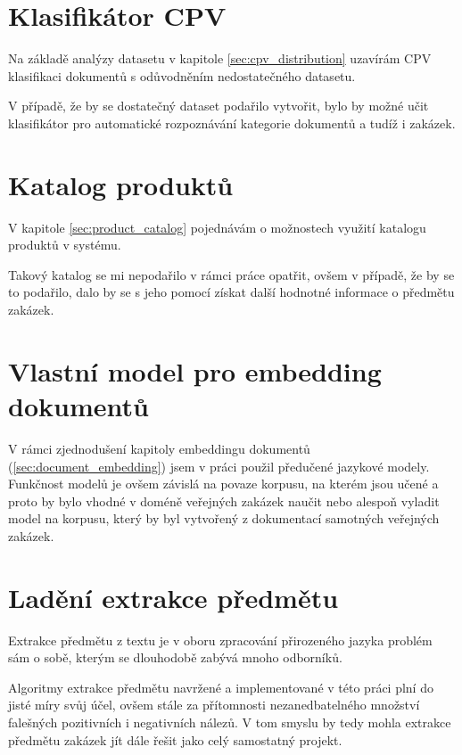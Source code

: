 \documentclass[thesis=M,czech]{FITthesis}[2019/12/23]
\begin{document}
\section{Klasifikátor CPV}

Na základě analýzy datasetu v kapitole \ref{sec:cpv_distribution} uzavírám CPV klasifikaci dokumentů s odůvodněním nedostatečného datasetu.

V případě, že by se dostatečný dataset podařilo vytvořit, bylo by možné učit klasifikátor pro automatické rozpoznávání kategorie dokumentů a tudíž i zakázek.

\section{Katalog produktů}

V kapitole \ref{sec:product_catalog} pojednávám o možnostech využití katalogu produktů v systému.

Takový katalog se mi nepodařilo v rámci práce opatřit, ovšem v případě, že by se to podařilo, dalo by se s jeho pomocí získat další hodnotné informace o předmětu zakázek.

\section{Vlastní model pro embedding dokumentů}

V rámci zjednodušení kapitoly embeddingu dokumentů (\ref{sec:document_embedding}) jsem v práci použil předučené jazykové modely. Funkčnost modelů je ovšem závislá na povaze korpusu, na kterém jsou učené a proto by bylo vhodné v doméně veřejných zakázek naučit nebo alespoň vyladit model na korpusu, který by byl vytvořený z dokumentací samotných veřejných zakázek.

\section{Ladění extrakce předmětu}
Extrakce předmětu z textu je v oboru zpracování přirozeného jazyka problém sám o sobě, kterým se dlouhodobě zabývá mnoho odborníků.

Algoritmy extrakce předmětu navržené a implementované v této práci plní do jisté míry svůj účel, ovšem stále za přítomnosti nezanedbatelného množství falešných pozitivních i negativních nálezů. V tom smyslu by tedy mohla extrakce předmětu zakázek jít dále řešit jako celý samostatný projekt.
\end{document}

